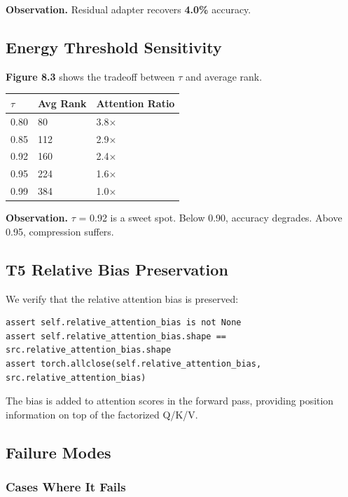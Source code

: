 \textbf{Observation.} Residual adapter recovers \textbf{4.0\%} accuracy.

\subsection{Energy Threshold Sensitivity}

\textbf{Figure 8.3} shows the tradeoff between $\tau$ and average rank.

\begin{table}[H]
\centering
\small
\begin{tabular}{lll}
\toprule
\textbf{$\tau$} & \textbf{Avg Rank} & \textbf{Attention Ratio} \\
\midrule
0.80 & 80 & 3.8$\times$ \\
0.85 & 112 & 2.9$\times$ \\
0.92 & 160 & 2.4$\times$ \\
0.95 & 224 & 1.6$\times$ \\
0.99 & 384 & 1.0$\times$ \\
\bottomrule
\end{tabular}
\end{table}

\textbf{Observation.} $\tau$ = 0.92 is a sweet spot. Below 0.90, accuracy degrades. 
Above 0.95, compression suffers.

\subsection{T5 Relative Bias Preservation}

We verify that the relative attention bias is preserved:

\begin{lstlisting}
assert self.relative_attention_bias is not None
assert self.relative_attention_bias.shape == src.relative_attention_bias.shape
assert torch.allclose(self.relative_attention_bias, src.relative_attention_bias)
\end{lstlisting}

The bias is added to attention scores in the forward pass, providing 
position information on top of the factorized Q/K/V.

\subsection{Failure Modes}

\subsubsection{Cases Where It Fails}

